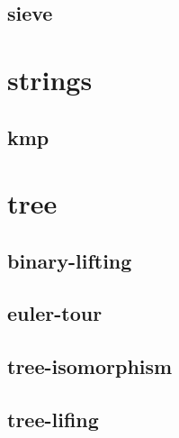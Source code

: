\documentclass[a4paper, twocolumn]{article}
\begin{document}
\subsection{sieve}

\section{strings}
\subsection{kmp}

\section{tree}
\subsection{binary-lifting}

\subsection{euler-tour}

\subsection{tree-isomorphism}

\subsection{tree-lifing}

\end{document}

